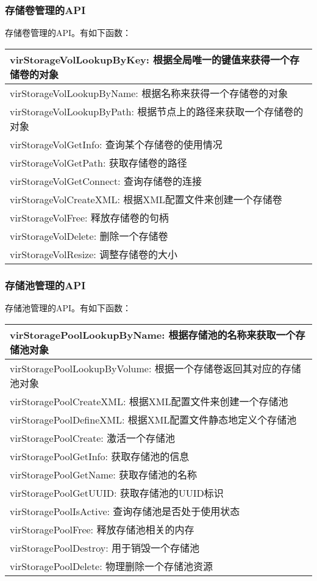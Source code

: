 \documentclass[a4paper,left=2.5cm,right=2.5cm,11pt]{article}
\begin{document}
\subsubsection{存储卷管理的API}

		存储卷管理的API。有如下函数：
		\begin{longtable}{p{13cm}}
		\hline
		virStorageVolLookupByKey: 根据全局唯一的键值来获得一个存储卷的对象 \\
		\hline
		virStorageVolLookupByName: 根据名称来获得一个存储卷的对象 \\
		\hline
		virStorageVolLookupByPath: 根据节点上的路径来获取一个存储卷的对象 \\
		\hline
		virStorageVolGetInfo: 查询某个存储卷的使用情况 \\
		\hline
		virStorageVolGetPath: 获取存储卷的路径 \\
		\hline
		virStorageVolGetConnect: 查询存储卷的连接 \\
		\hline
		virStorageVolCreateXML: 根据XML配置文件来创建一个存储卷 \\
		\hline
		virStorageVolFree: 释放存储卷的句柄 \\
		\hline
		virStorageVolDelete: 删除一个存储卷 \\
		\hline
		virStorageVolResize: 调整存储卷的大小 \\
		\hline
		\end{longtable}

\subsubsection{存储池管理的API}
		存储池管理的API。有如下函数：
		\begin{longtable}{p{13cm}}
		\hline
		virStoragePoolLookupByName: 根据存储池的名称来获取一个存储池对象 \\
		\hline
		virStoragePoolLookupByVolume: 根据一个存储卷返回其对应的存储池对象 \\
		\hline
		virStoragePoolCreateXML: 根据XML配置文件来创建一个存储池 \\
		\hline
		virStoragePoolDefineXML: 根据XML配置文件静态地定义个存储池 \\
		\hline
		virStoragePoolCreate: 激活一个存储池 \\
		\hline
		virStoragePoolGetInfo: 获取存储池的信息 \\
		\hline
		virStoragePoolGetName: 获取存储池的名称 \\
		\hline
		virStoragePoolGetUUID: 获取存储池的UUID标识 \\
		\hline
		virStoragePoolIsActive: 查询存储池是否处于使用状态 \\
		\hline
		virStoragePoolFree: 释放存储池相关的内存 \\
		\hline
		virStoragePoolDestroy: 用于销毁一个存储池 \\
		\hline
		virStoragePoolDelete: 物理删除一个存储池资源 \\
		\hline
		\end{longtable}
\end{document}
